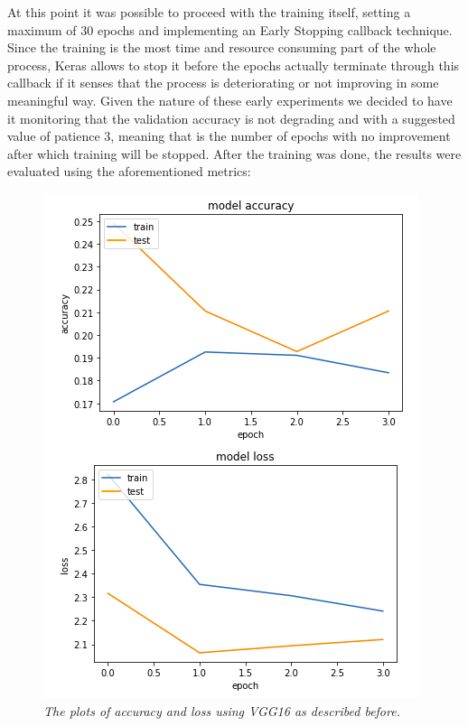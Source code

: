 \documentclass[12pt,a4paper]{report}
\begin{document}
At this point it was possible to proceed with the training itself, setting a maximum of 30 epochs and implementing an Early Stopping callback technique. Since the training is the most time and resource consuming part of the whole process, Keras allows to stop it before the epochs actually terminate through this callback if it senses that the process is deteriorating or not improving in some meaningful way. Given the nature of these early experiments we decided to have it monitoring that the validation accuracy is not degrading and with a suggested value of patience 3, meaning that is the number of epochs with no improvement after which training will be stopped. After the training was done, the results were evaluated using the aforementioned metrics:
\begin{figure}[H]
\centering
\includegraphics[scale=0.4]{./immagini/vgg16/0_data_augmentation_-_3_patience_stopping_-_no_dropout_-_no_batch_norm/plot_loss_accuracy.png}
\caption{\textit{The plots of accuracy and loss using VGG16 as described before.}}
\end{figure}
\end{document}

